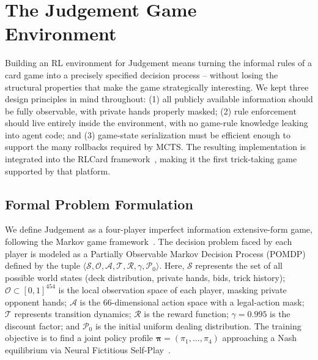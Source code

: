 \documentclass[conference]{IEEEtran}
\begin{document}
\section{\large \textbf{The Judgement Game Environment}}
 
Building an RL environment for Judgement means turning the informal rules of a card game into a precisely specified decision process -- without losing the structural properties that make the game strategically interesting. We kept three design principles in mind throughout: (1) all publicly available information should be fully observable, with private hands properly masked; (2) rule enforcement should live entirely inside the environment, with no game-rule knowledge leaking into agent code; and (3) game-state serialization must be efficient enough to support the many rollbacks required by MCTS. The resulting implementation is integrated into the RLCard framework~\cite{zha2021rlcard}, making it the first trick-taking game supported by that platform.
 
\subsection{\textbf{Formal Problem Formulation}}
 
We define Judgement as a four-player imperfect information extensive-form game, following the Markov game framework~\cite{Littman1994MarkovGA}. The decision problem faced by each player is modeled as a Partially Observable Markov Decision Process (POMDP) defined by the tuple $\langle \mathcal{S}, \mathcal{O}, \mathcal{A}, \mathcal{T}, \mathcal{R}, \gamma, \mathcal{P}_0 \rangle$. Here, $\mathcal{S}$ represents the set of all possible world states (deck distribution, private hands, bids, trick history); $\mathcal{O} \subset [0,1]^{454}$ is the local observation space of each player, masking private opponent hands; $\mathcal{A}$ is the $66$-dimensional action space with a legal-action mask; $\mathcal{T}$ represents transition dynamics; $\mathcal{R}$ is the reward function; $\gamma=0.995$ is the discount factor; and $\mathcal{P}_0$ is the initial uniform dealing distribution. The training objective is to find a joint policy profile $\boldsymbol{\pi}=(\pi_1,\dots,\pi_4)$ approaching a Nash equilibrium via Neural Fictitious Self-Play~\cite{silver2016deep}.
 
\end{document}
